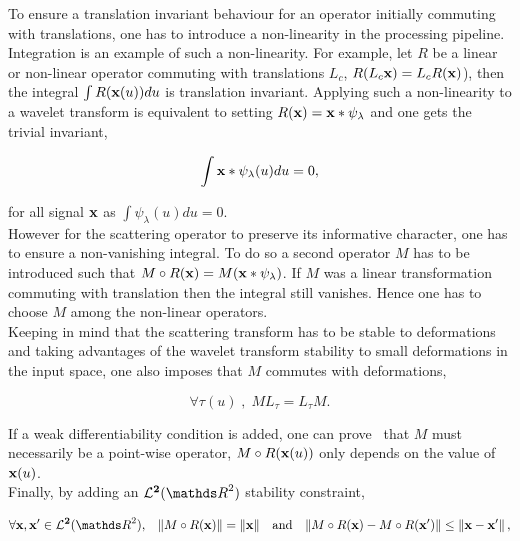 \documentclass[a4paper,11pt]{report}
\begin{document}
      To ensure a translation invariant behaviour for an operator initially commuting with translations, one has to introduce a non-linearity in the processing pipeline. Integration is an example of such a non-linearity. For example, let $R$ be a linear or non-linear operator commuting with translations $L_{c}$, \ie $R(L_{c}{\bf x}) = L_{c}R({\bf x})$), then the integral $\int R({\bf x}(u))du$ is  translation invariant. Applying such a non-linearity to a wavelet transform is equivalent to setting $R({\bf x}) = {\bf x} \ast \psi_{\lambda}$ and one gets the trivial invariant, 
      
      \begin{equation*}
				\label{eq:Trivial invariant}
				\int {\bf x} \ast \psi_{\lambda}(u)du = 0,
      \end{equation*}
      
      for all signal ${\bf x}$ as $\int \psi_{\lambda}(u)du = 0$.\\
      
      However for the scattering operator to preserve its informative character, one has to ensure a non-vanishing integral. To do so a second operator $M$ has to be introduced such that $M \circ R({\bf x}) = M({\bf x} \ast \psi_{\lambda})$. If $M$ was a linear  transformation commuting with translation then the integral still vanishes. Hence one has to choose $M$ among the non-linear operators.\\
      
      Keeping in mind that the scattering transform has to be stable to deformations and taking advantages of the wavelet transform stability to small deformations in the input space, one also imposes that $M$ commutes with deformations, 
      
      \begin{equation*}
				\label{eq:Commute with deformations}
				\forall \tau(u) \; , \; M L_{\tau} = L_{\tau} M.
      \end{equation*}
      
      If a weak differentiability condition is added, one can prove~\citep{bruna2012commute} that $M$ must necessarily be a point-wise operator, \ie $M \circ R({\bf x}(u))$ only depends on the value of ${\bf x}(u)$.\\
      
      Finally, by adding an $\mathbf{\mcalL^{2}}(\dsR^{2})$ stability constraint,
      
      \begin{equation*}
				\label{eq:L2 stability}
				\forall \bfx,\bfx' \in \mathbf{\mcalL^{2}}(\dsR^{2}), \;\;\; 
				\norm{M \circ R(\bfx)} = \norm{\bfx} 
				\;\;\; \text{and} \;\;\;
				\norm{M \circ R(\bfx) - M \circ R(\bfx')} \leq \norm{\bfx-\bfx'},
      \end{equation*}     
      
\end{document}
